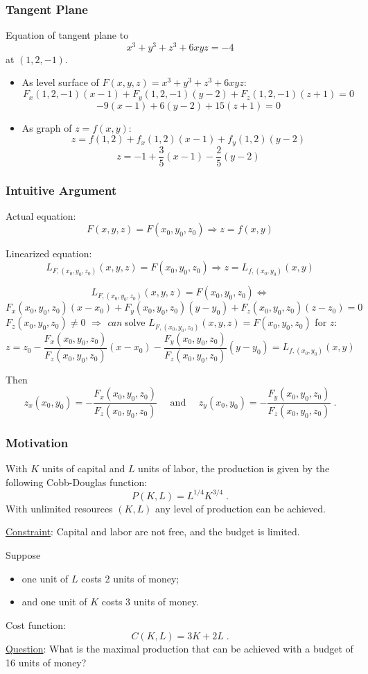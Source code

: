 \begin{frame}
  \frametitle{Tangent Plane}

  Equation of tangent plane to
  $$x^3+y^3+z^3+6xyz =-4$$
  at $(1,2,-1)$.

  \begin{itemize}
    \item \pause As level surface of $F(x,y,z) = x^3+y^3+z^3+6xyz$:
    $$F_x(1,2,-1) (x-1) + F_y(1,2,-1) (y-2) + F_z(1,2,-1) (z+1) = 0$$
    $$-9(x-1) + 6(y-2) + 15 (z+1) = 0$$

    \item \pause As graph of $z=f(x,y)$:
    $$z = f(1,2) + f_x(1,2) (x-1) + f_y(1,2) (y-2)$$
    $$z = -1 + \frac{3}{5} (x-1) - \frac{2}{5} (y-2)$$
  \end{itemize}
\end{frame}

\begin{frame}
  \frametitle{Intuitive Argument}

  Actual equation:
  $$F(x,y,z) = F(x_0,y_0,z_0) \Longrightarrow z= f(x,y)$$

  \pause Linearized equation:
  $$L_{F,(x_0,y_0,z_0)}(x,y,z) = F(x_0,y_0,z_0) \Longrightarrow z = L_{f,(x_0,y_0)}(x,y)$$

%
$$L_{F,(x_0,y_0,z_0)}(x,y,z) = F(x_0,y_0,z_0) \Longleftrightarrow$$
%
$$F_x(x_0,y_0,z_0) (x-x_0) + F_y(x_0,y_0,z_0) (y-y_0)+ F_z(x_0,y_0,z_0) (z-z_0)=0$$
%
\pause $F_z(x_0,y_0,z_0) \neq 0$ $\Longrightarrow$ \emph{can} solve $L_{F,(x_0,y_0,z_0)}(x,y,z) = F(x_0,y_0,z_0)$ for $z$:
%
$$z = z_0 - \frac{F_x(x_0,y_0,z_0)}{F_z(x_0,y_0,z_0)}(x-x_0) - \frac{F_y(x_0,y_0,z_0)}{F_z(x_0,y_0,z_0)}(y-y_0) = L_{f,(x_0,y_0)}(x,y)$$

Then
%
$$z_x(x_0,y_0) = - \frac{F_x(x_0,y_0,z_0)}{F_z(x_0,y_0,z_0)} \quad \text{ and } \quad z_y(x_0,y_0) =- \frac{F_y(x_0,y_0,z_0)}{F_z(x_0,y_0,z_0)} \;.$$
\end{frame}
 
 \begin{frame}
  \frametitle{Motivation}

  With $K$ units of capital and $L$ units of labor, the production is given by the following Cobb-Douglas function:
%
$$P(K,L) = L^{1/4} K^{3/4}\; .$$
%
\pause With unlimited resources $(K,L)$ \pause any level of production can be achieved. \pause

\underline{Constraint}: \pause Capital and labor are not free, and the budget is limited.\pause

Suppose
\begin{itemize}
  \item one  unit of $L$ costs 2 units of money;
  \item and one unit of $K$ costs 3 units of money.
\end{itemize}

\pause Cost function:\pause
%
$$C(K,L) = 3K +2L\; .$$
%
\pause \underline{Question}: What is the maximal production that can be achieved with a budget of 16 units of money?
\end{frame}

